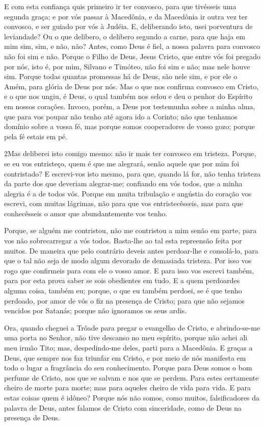 E com esta confiança quis primeiro ir ter convosco, para que
tivésseis uma segunda graça; e por vós passar à Macedônia, e
da Macedônia ir outra vez ter convosco, e ser guiado por vós à
Judéia. E, deliberando isto, usei porventura de leviandade?
Ou o que delibero, o delibero segundo a carne, para que haja em mim
sim, sim, e não, não? Antes, como Deus é fiel, a nossa
palavra para convosco não foi sim e não. Porque o Filho de
Deus, Jesus Cristo, que entre vós foi pregado por nós, isto é, por
mim, Silvano e Timóteo, não foi sim e não; mas nele houve sim.
Porque todas quantas promessas há de Deus, são nele sim, e
por ele o Amém, para glória de Deus por nós. Mas o que nos
confirma convosco em Cristo, e o que nos ungiu, é Deus, o
qual também nos selou e deu o penhor do Espírito em nossos corações.
Invoco, porém, a Deus por testemunha sobre a minha alma, que
para vos poupar não tenho até agora ido a Corinto; não que
tenhamos domínio sobre a vossa fé, mas porque somos cooperadores de
vosso gozo; porque pela fé estais em pé.


\medskip

\lettrine{2} Mas deliberei isto comigo mesmo: não ir mais ter
convosco em tristeza. Porque, se eu vos entristeço, quem é que
me alegrará, senão aquele que por mim foi contristado? E
escrevi-vos isto mesmo, para que, quando lá for, não tenha tristeza
da parte dos que deveriam alegrar-me; confiando em vós todos, que a
minha alegria é a de todos vós. Porque em muita tribulação e
angústia do coração vos escrevi, com muitas lágrimas, não para que
vos entristecêsseis, mas para que conhecêsseis o amor que
abundantemente vos tenho.

Porque, se alguém me contristou, não me contristou a mim senão em
parte, para vos não sobrecarregar a vós todos. Basta-lhe ao tal
esta repreensão feita por muitos. De maneira que pelo contrário
deveis antes perdoar-lhe e consolá-lo, para que o tal não seja de
modo algum devorado de demasiada tristeza. Por isso vos rogo que
confirmeis para com ele o vosso amor. E para isso vos escrevi
também, para por esta prova saber se sois obedientes em tudo.
E a quem perdoardes alguma coisa, também eu; porque, o que eu
também perdoei, se é que tenho perdoado, por amor de vós o fiz na
presença de Cristo; para que não sejamos vencidos por Satanás;
porque não ignoramos os seus ardis.

Ora, quando cheguei a Trôade para pregar o evangelho de Cristo, e
abrindo-se-me uma porta no Senhor, não tive descanso no meu
espírito, porque não achei ali meu irmão Tito; mas, despedindo-me
deles, parti para a Macedônia. E graças a Deus, que sempre
nos faz triunfar em Cristo, e por meio de nós manifesta em todo o
lugar a fragrância do seu conhecimento. Porque para Deus
somos o bom perfume de Cristo, nos que se salvam e nos que se
perdem. Para estes certamente cheiro de morte para morte; mas
para aqueles cheiro de vida para vida. E para estas coisas quem é
idôneo? Porque nós não somos, como muitos, falsificadores da
palavra de Deus, antes falamos de Cristo com sinceridade, como de
Deus na presença de Deus.

